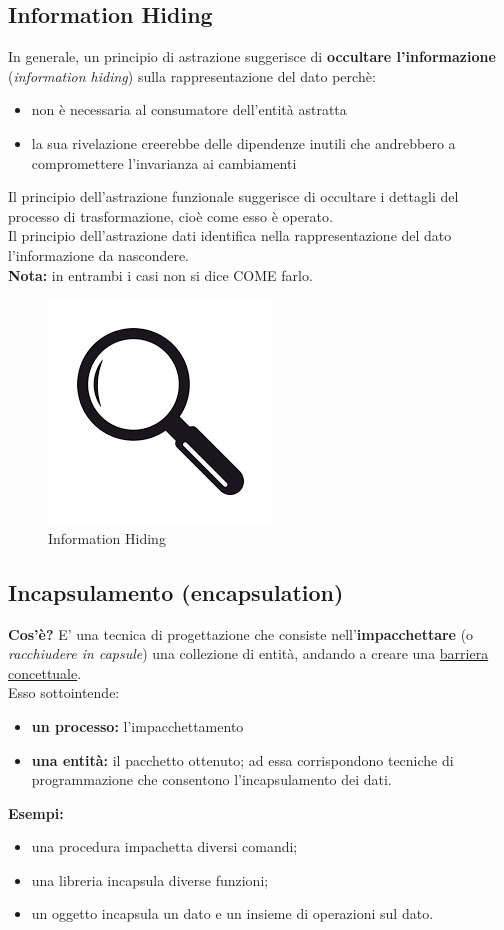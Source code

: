 \documentclass{article}
\begin{document}
	\subsection{Information Hiding}
	In generale, un principio di astrazione suggerisce di \textbf{occultare l'informazione} (\textit{information hiding}) sulla rappresentazione del dato perchè:
	\begin{itemize}
		\item non è necessaria al consumatore dell'entità astratta
		\item la sua rivelazione creerebbe delle dipendenze inutili che andrebbero a compromettere l'invarianza ai cambiamenti
	\end{itemize}
	Il principio dell'astrazione funzionale suggerisce di occultare i dettagli del processo di trasformazione, cioè come esso è operato.\\
	Il principio dell'astrazione dati identifica nella rappresentazione del dato l'informazione da nascondere. \\
	\textbf{Nota:} in entrambi i casi non si dice COME farlo.
	\begin{figure}[h] %
		\centering
		\includegraphics[width=0.2\linewidth]{assets/immagine2} 
		\caption{Information Hiding}
		\label{fig:etichetta}
	\end{figure}
	
	\subsection{Incapsulamento (encapsulation)}
	\textbf{Cos'è?} E' una tecnica di progettazione che consiste nell'\textbf{impacchettare} (o \textit{racchiudere in capsule}) una collezione di entità, andando a creare una \underline{barriera} \underline{concettuale}.
	\vspace{\baselineskip} \\
	Esso sottointende:
	\begin{itemize}
		\item \textbf{un processo:} l'impacchettamento
		\item \textbf{una entità:} il pacchetto ottenuto; ad essa corrispondono tecniche di programmazione che consentono l'incapsulamento dei dati.
	\end{itemize}
	\textbf{Esempi:}
	\begin{itemize}
		\item una procedura impachetta diversi comandi;
		\item una libreria incapsula diverse funzioni;
		\item un oggetto incapsula un dato e un insieme di operazioni sul dato.
	\end{itemize} 
	
\end{document}
